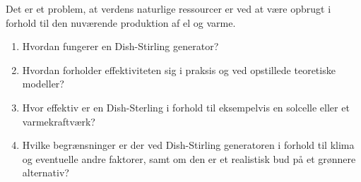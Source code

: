 \documentclass[SRC.tex]{subfiles}
\begin{document}
	Det er et problem, at verdens naturlige ressourcer er ved at være opbrugt i forhold til den nuværende produktion af el og varme.  
	\begin{enumerate}[-]
		\item Hvordan fungerer en Dish-Stirling generator?
		\item 	Hvordan forholder effektiviteten sig i praksis og ved opstillede teoretiske modeller?
		\item 	Hvor effektiv er en Dish-Sterling i forhold til eksempelvis en solcelle eller et varmekraftværk?
		\item Hvilke begrænsninger er der ved Dish-Stirling generatoren i forhold til klima og eventuelle andre faktorer, samt om den er et realistisk bud på et grønnere alternativ? 
	\end{enumerate} 
\end{document}
